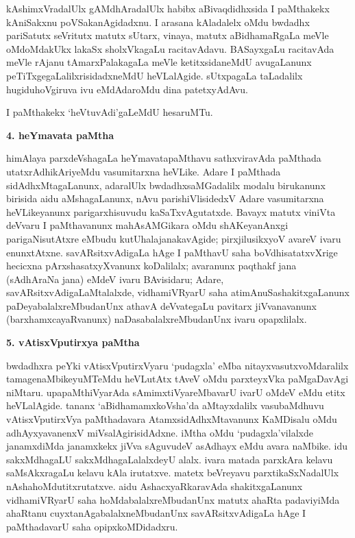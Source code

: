 kAshimxVradalUlx gAMdhAradalUlx habibx aBivaqdidhxsida I paMthakekx kAniSakxnu poVSakanAgidadxnu. I arasana kAladalelx oMdu bwdadhx pariSatutx  seVritutx matutx sUtarx, vinaya, matutx aBidhamaRgaLa meVle oMdoMdakUkx lakaSx sholxVkagaLu racitavAdavu. BASayxgaLu racitavAda meVle rAjanu tAmarxPalakagaLa meVle ketitxsidaneMdU avugaLanunx peTiTxgegaLalilxrisidadxneMdU heVLalAgide. sUtxpagaLa taLadalilx hugiduhoVgiruva ivu eMdAdaroMdu dina patetxyAdAvu.

I paMthakekx `heVtuvAdi'gaLeMdU hesaruMTu.

\begin{center}
{\textbf{\Large 4. heYmavata paMtha}}
\end{center}

himAlaya parxdeVshagaLa heYmavatapaMthavu sathxviravAda paMthada utatxrAdhikAri\-yeMdu vasumitarxna heVLike. Adare I paMthada sidAdhxMtagaLanunx, adaralUlx bwdadhxsaMGadalilx modalu birukanunx birisida aidu aMshagaLanunx, nAvu parishiVlisidedxV Adare vasumitarxna heVLikeyanunx parigarxhisuvudu kaSaTxvAgutatxde. Bavayx matutx viniVta deVvaru I paMthavanunx mahAsAMGikara oMdu shAKeyanAnxgi parigaNisutAtxre eMbudu kutUhalajanakavAgide; pirxjilusikxyoV avareV ivaru enunxtAtxne. savARsitxvAdigaLa hAge I paMthavU saha boVdhisatatxvXrige hecicxna pArxshasatxyXvanunx koDalilalx; avaranunx paqthakf jana (sAdhAraNa jana) eMdeV ivaru BAvisidaru; Adare, savARsitxvAdigaLaMtalalxde, vidhamiVRyarU saha atimAnuSashakitxgaLanunx paDeyabalalxreMbudanUnx athavA deVvategaLu pavitarx jiVvanavanunx (barxhamxcayaRvanunx) naDasabalalxreMbudanUnx ivaru opapxlilalx.

\begin{center}
{\textbf{\Large 5. vAtisxVputirxya paMtha}}
\end{center}

bwdadhxra peYki vAtisxVputirxVyaru `pudagxla' eMba nitayxvasutxvoMdaralilx tamage\break naMbikeyuMTeMdu heVLutAtx tAveV oMdu parxteyxVka paMgaDavAgi niMtaru. upa\-paMthiVyarAda sAmimxtiVyareMbavarU ivarU oMdeV eMdu etitx heVLalAgide. tananx `aBidhamamxkoVsha'da aMtayxdalilx vasubaMdhuvu vAtisxVputirxVya paMthadavara AtamxsidAdhxMtavanunx KaMDisalu oMdu adhAyxyavanenxV miVsalAgirisidAdxne. iMtha oMdu `pudagxla'vilalxde janamxdiMda janamxkekx jiVva sAguvudeV asAdhayx eMdu avara naMbike. idu sakxMdhagaLU sakxMdhagaLalalxdeyU alalx. ivara matada parxkAra kelavu saMsAkxragaLu kelavu kAla irutatxve. matetx beVreyavu parxtikaSxNadalUlx nAshahoMdutitxrutatxve. aidu AshacxyaRkaravAda shakitxgaLanunx vidhamiVRyarU saha hoMdabalalxreMbudanUnx matutx ahaRta padaviyiMda ahaRtanu cuyxtanAgabalalxneMbudanUnx savARsitxvAdigaLa hAge I paMthadavarU saha opipxkoMDidadxru.

